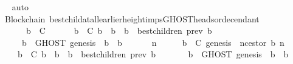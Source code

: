 \begin{isabellebody}
%
\isadelimproof
\ \ %
\endisadelimproof
%
\isatagproof
{}\isamarkupfalse%
\ auto\ \isanewline
\ \ \isamarkupfalse%
%
\endisatagproof
{\isafoldproof}%
%
\isadelimproof
\isanewline
%
\endisadelimproof
\isanewline
{}\isamarkupfalse%
\ {\isacharparenleft}\ Blockchain{\isacharparenright}\ best{\isacharunderscore}child{\isacharunderscore}at{\isacharunderscore}all{\isacharunderscore}earlier{\isacharunderscore}height{\isacharunderscore}imps{\isacharunderscore}GHOST{\isacharunderscore}heads{\isacharunderscore}or{\isacharunderscore}decendant\ {\isacharcolon}\isanewline
\ \ {\isachardoublequoteopen}{\isasymforall}\ {\isasymsigma}\ {\isasymin}\ {\isasymSigma}{\isachardot}\ {\isasymforall}\ b\ {\isasymin}\ C{\isachardot}\ \isanewline
\ \ \ \ {\isacharparenleft}{\isasymforall}\ b{\isacharprime}\ {\isasymin}\ C{\isachardot}\ b{\isacharprime}\ {\isasymdownharpoonright}\ b\ {\isasymlongrightarrow}\ b{\isacharprime}\ {\isasymin}\ best{\isacharunderscore}children\ {\isacharparenleft}prev\ b{\isacharprime}{\isacharcomma}\ {\isasymsigma}{\isacharparenright}{\isacharparenright}\isanewline
\ \ \ \ {\isasymlongrightarrow}\ {\isacharparenleft}{\isasymforall}\ b{\isacharprime}{\isacharprime}\ {\isasymin}\ GHOST\ {\isacharparenleft}{\isacharbraceleft}genesis{\isacharbraceright}{\isacharcomma}\ {\isasymsigma}{\isacharparenright}{\isachardot}\ b\ {\isasymdownharpoonright}\ b{\isacharprime}{\isacharprime}{\isacharparenright}{\isachardoublequoteclose}\isanewline
%
\isadelimproof
%
\endisadelimproof
%
\isatagproof
{}\isamarkupfalse%
\ {\isacharminus}\isanewline
\ \ \isamarkupfalse%
\ {\isachardoublequoteopen}{\isasymAnd}\ n{\isachardot}\ {\isasymforall}\ {\isasymsigma}\ {\isasymin}\ {\isasymSigma}{\isachardot}\ {\isasymforall}\ b\ {\isasymin}\ C{\isachardot}\ genesis\ {\isacharequal}\ n{\isacharunderscore}cestor\ {\isacharparenleft}b{\isacharcomma}\ n{\isacharparenright}\ {\isasymand}\isanewline
\ \ \ \ {\isacharparenleft}{\isasymforall}\ b{\isacharprime}\ {\isasymin}\ C{\isachardot}\ b{\isacharprime}\ {\isasymdownharpoonright}\ b\ {\isasymlongrightarrow}\ b{\isacharprime}\ {\isasymin}\ best{\isacharunderscore}children\ {\isacharparenleft}prev\ b{\isacharprime}{\isacharcomma}\ {\isasymsigma}{\isacharparenright}{\isacharparenright}\isanewline
\ \ \ \ {\isasymlongrightarrow}\ {\isacharparenleft}{\isasymforall}\ b{\isacharprime}{\isacharprime}\ {\isasymin}\ GHOST\ {\isacharparenleft}{\isacharbraceleft}genesis{\isacharbraceright}{\isacharcomma}\ {\isasymsigma}{\isacharparenright}{\isachardot}\ b\ {\isasymdownharpoonright}\ b{\isacharprime}{\isacharprime}{\isacharparenright}{\isachardoublequoteclose}\isanewline

\end{isabellebody}
